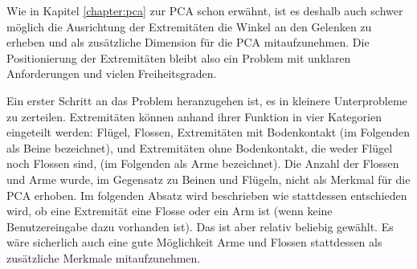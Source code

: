 Wie in Kapitel \ref{chapter:pca} zur PCA schon erwähnt, ist es deshalb auch schwer möglich die Ausrichtung der Extremitäten \bzw die Winkel an den Gelenken zu erheben und als zusätzliche Dimension für die PCA mitaufzunehmen.
Die Positionierung der Extremitäten bleibt also ein Problem mit unklaren Anforderungen und vielen Freiheitsgraden.

Ein erster Schritt an das Problem heranzugehen ist, es in kleinere Unterprobleme zu zerteilen.
Extremitäten können anhand ihrer Funktion in vier Kategorien eingeteilt werden:
Flügel, Flossen, Extremitäten mit Bodenkontakt (im Folgenden als Beine bezeichnet), und Extremitäten ohne Bodenkontakt, die weder Flügel noch Flossen sind, (im Folgenden als Arme bezeichnet). Die Anzahl der Flossen und Arme wurde, im Gegensatz zu Beinen und Flügeln, nicht als Merkmal für die PCA erhoben. Im folgenden Absatz wird beschrieben wie stattdessen entschieden wird, ob eine Extremität eine Flosse oder ein Arm ist (wenn keine Benutzereingabe dazu vorhanden ist). Das ist aber relativ beliebig gewählt. Es wäre sicherlich auch eine gute Möglichkeit Arme und Flossen stattdessen als zusätzliche Merkmale mitaufzunehmen.

